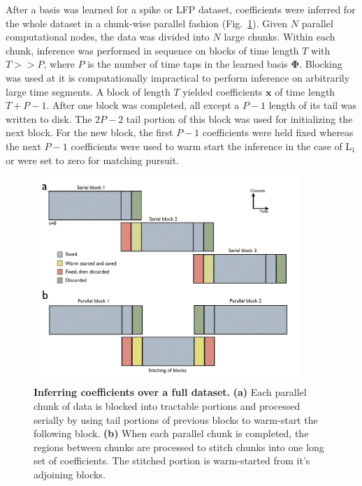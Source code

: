 \documentclass[10pt]{article}
\newcommand{\mb}{\mathbf}
\begin{document}
After a basis was learned for a spike or LFP dataset, coefficients
were inferred for the whole dataset in a chunk-wise parallel fashion
(Fig.~\ref{fig:parallelblock}). Given $N$ parallel computational
nodes, the data was divided into $N$ large chunks. Within each chunk,
inference was performed in sequence on blocks of time length $T$ with
$T >> P$, where $P$ is the number of time taps in the learned basis
$\mb{\Phi}$. Blocking was used at it is computationally impractical to
perform inference on arbitrarily large time segments. A block of
length $T$ yielded coefficients $\mb{x}$ of time length $T+P-1$. After
one block was completed, all except a $P-1$ length of its tail was
written to disk. The $2P-2$ tail portion of this block was used for
initializing the next block. For the new block, the first $P-1$
coefficients were held fixed whereas the next $P-1$ coefficients were
used to warm start the inference in the case of L$_1$ or were set to
zero for matching pursuit.

\begin{figure}[ht!]
  \centering
  \includegraphics[width=0.9\textwidth]{fig6.pdf}
  \caption{\textbf{Inferring coefficients over a full dataset.}
    \textbf{(a)} Each parallel chunk of data is blocked into tractable
    portions and processed serially by using tail portions of previous
    blocks to warm-start the following block. \textbf{(b)} When each
    parallel chunk is completed, the regions between chunks are
    processed to stitch chunks into one long set of coefficients. The
    stitched portion is warm-started from it's adjoining blocks.}
  \label{fig:parallelblock}
\end{figure}
\end{document}
